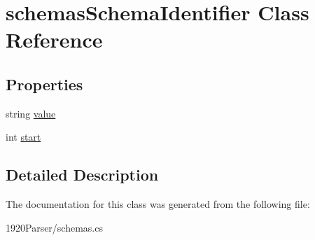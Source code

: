 \hypertarget{classschemas_schema_identifier}{}\section{schemas\+Schema\+Identifier Class Reference}
\label{classschemas_schema_identifier}


 


\subsection*{Properties}
\begin{DoxyCompactItemize}
\item 
string \hyperlink{classschemas_schema_identifier_a0dcd51bb1fb87d49765cf031b4425a46}{value}\hypertarget{classschemas_schema_identifier_a0dcd51bb1fb87d49765cf031b4425a46}{}\label{classschemas_schema_identifier_a0dcd51bb1fb87d49765cf031b4425a46}

\item 
int \hyperlink{classschemas_schema_identifier_a050bed554a3f4564b1e029d95d020905}{start}\hypertarget{classschemas_schema_identifier_a050bed554a3f4564b1e029d95d020905}{}\label{classschemas_schema_identifier_a050bed554a3f4564b1e029d95d020905}

\end{DoxyCompactItemize}


\subsection{Detailed Description}


The documentation for this class was generated from the following file\+:\begin{DoxyCompactItemize}
\item 
1920\+Parser/schemas.\+cs\end{DoxyCompactItemize}
